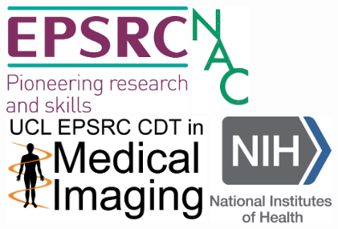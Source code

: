 \documentclass[portrait,a0,final,20pt]{a0poster}
\begin{document}
\begin{multicols}{2}
\vspace{0em}
\newcommand{\heightLogos}{3.5cm}
\includegraphics[height=\heightLogos]{epsrc_logo}
\hspace{0.5em}
\includegraphics[height=\heightLogos]{nac_logo} 
\hspace{0.5em}
\includegraphics[height=\heightLogos]{cdt_logo} 
\hspace{0.5em}
\includegraphics[height=\heightLogos]{nih_logo} 

\end{multicols}
\end{document}
